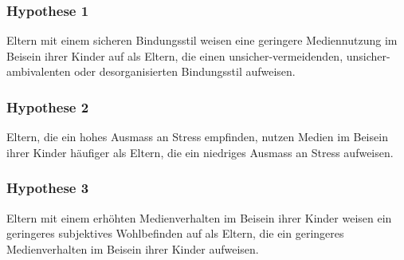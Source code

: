 \subsubsection{Hypothese 1}
Eltern mit einem sicheren Bindungsstil weisen eine geringere Mediennutzung im Beisein ihrer Kinder auf als Eltern, die einen unsicher-vermeidenden, unsicher-ambivalenten oder desorganisierten Bindungsstil aufweisen.
\subsubsection{Hypothese 2}
Eltern, die ein hohes Ausmass an Stress empfinden, nutzen Medien im Beisein ihrer Kinder häufiger als Eltern, die ein niedriges Ausmass an Stress aufweisen.
\subsubsection{Hypothese 3}
Eltern mit einem erhöhten Medienverhalten im Beisein ihrer Kinder weisen ein geringeres subjektives Wohlbefinden auf als Eltern, die ein geringeres Medienverhalten im Beisein ihrer Kinder aufweisen.
